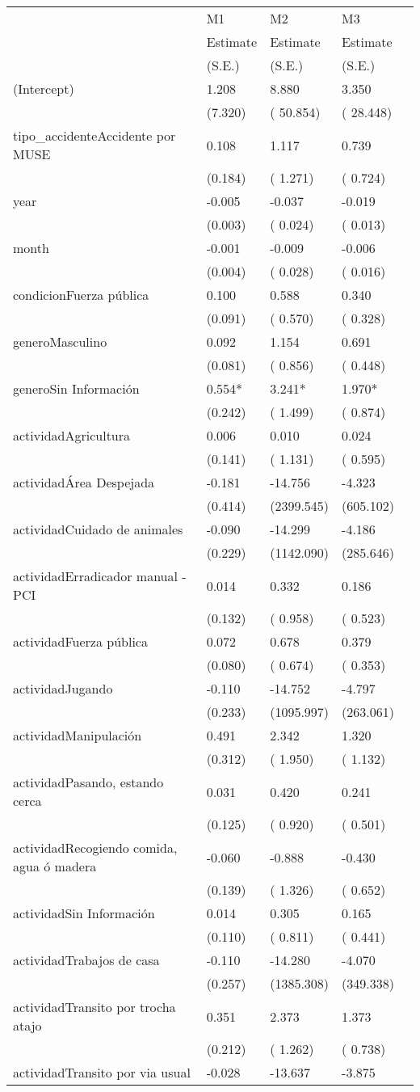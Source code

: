 \begin{tabular}{@{}l*{4}{l}@{}}
\hline
  &\multicolumn{1}{l}{M1  } &\multicolumn{1}{l}{M2  } &\multicolumn{1}{l}{M3  }\tabularnewline
 &\multicolumn{1}{l}{Estimate}&\multicolumn{1}{l}{Estimate}&\multicolumn{1}{l}{Estimate}\tabularnewline
 &\multicolumn{1}{l}{(S.E.)}&\multicolumn{1}{l}{(S.E.)}&\multicolumn{1}{l}{(S.E.)}\tabularnewline
 \hline
 \hline
  (Intercept) & 1.208 & 8.880 & 3.350 \tabularnewline
 &(7.320)&(  50.854)&( 28.448)\tabularnewline
  tipo_accidenteAccidente por MUSE & 0.108 & 1.117 & 0.739 \tabularnewline
 &(0.184)&(   1.271)&(  0.724)\tabularnewline
  year & -0.005 & -0.037 & -0.019 \tabularnewline
 &(0.003)&(   0.024)&(  0.013)\tabularnewline
  month & -0.001 & -0.009 & -0.006 \tabularnewline
 &(0.004)&(   0.028)&(  0.016)\tabularnewline
  condicionFuerza pública & 0.100 & 0.588 & 0.340 \tabularnewline
 &(0.091)&(   0.570)&(  0.328)\tabularnewline
  generoMasculino & 0.092 & 1.154 & 0.691 \tabularnewline
 &(0.081)&(   0.856)&(  0.448)\tabularnewline
  generoSin Información & 0.554* & 3.241* & 1.970* \tabularnewline
 &(0.242)&(   1.499)&(  0.874)\tabularnewline
  actividadAgricultura & 0.006 & 0.010 & 0.024 \tabularnewline
 &(0.141)&(   1.131)&(  0.595)\tabularnewline
  actividadÁrea Despejada & -0.181 & -14.756 & -4.323 \tabularnewline
 &(0.414)&(2399.545)&(605.102)\tabularnewline
  actividadCuidado de animales & -0.090 & -14.299 & -4.186 \tabularnewline
 &(0.229)&(1142.090)&(285.646)\tabularnewline
  actividadErradicador manual - PCI & 0.014 & 0.332 & 0.186 \tabularnewline
 &(0.132)&(   0.958)&(  0.523)\tabularnewline
  actividadFuerza pública & 0.072 & 0.678 & 0.379 \tabularnewline
 &(0.080)&(   0.674)&(  0.353)\tabularnewline
  actividadJugando & -0.110 & -14.752 & -4.797 \tabularnewline
 &(0.233)&(1095.997)&(263.061)\tabularnewline
  actividadManipulación & 0.491 & 2.342 & 1.320 \tabularnewline
 &(0.312)&(   1.950)&(  1.132)\tabularnewline
  actividadPasando, estando cerca & 0.031 & 0.420 & 0.241 \tabularnewline
 &(0.125)&(   0.920)&(  0.501)\tabularnewline
  actividadRecogiendo comida, agua ó  madera & -0.060 & -0.888 & -0.430 \tabularnewline
 &(0.139)&(   1.326)&(  0.652)\tabularnewline
  actividadSin Información & 0.014 & 0.305 & 0.165 \tabularnewline
 &(0.110)&(   0.811)&(  0.441)\tabularnewline
  actividadTrabajos de casa & -0.110 & -14.280 & -4.070 \tabularnewline
 &(0.257)&(1385.308)&(349.338)\tabularnewline
  actividadTransito por trocha atajo & 0.351 & 2.373 & 1.373 \tabularnewline
 &(0.212)&(   1.262)&(  0.738)\tabularnewline
  actividadTransito por via usual & -0.028 & -13.637 & -3.875 \tabularnewline

\end{tabular}
